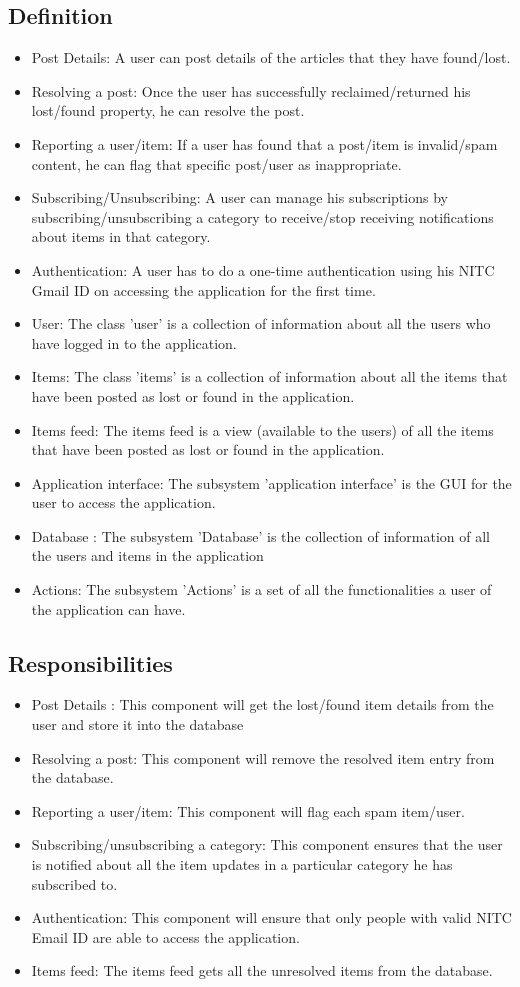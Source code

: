 \documentclass[a4paper,12pt]{article}
\begin{document}
\subsection{Definition}
\begin{itemize}
\item Post Details: A user can post details of the articles that they have found/lost. 
\item Resolving a post: Once the user has successfully reclaimed/returned his lost/found property, he can resolve the post. 
\item Reporting a user/item: If a user has found that a post/item is invalid/spam content, he can flag that specific post/user as inappropriate. 
\item Subscribing/Unsubscribing: A user can manage his subscriptions by subscribing/unsubscribing a category to receive/stop receiving notifications about items in that category.
\item Authentication: A user has to do a one-time authentication using his NITC Gmail ID on accessing the application for the first time. 
\item User: The class 'user' is a collection of information about all the users who have logged in to the application.
\item Items: The class 'items' is a collection of information about all the items that have been posted as lost or found in the application. 
\item Items feed: The items feed is a view (available to the users) of all the items that have been posted as lost or found in the application. 
\item Application interface: The subsystem 'application interface' is the GUI for the user to access the application.     
\item Database : The subsystem 'Database' is the collection of information of all the users and items in the application 
\item Actions: The subsystem 'Actions' is a set of all the functionalities a user of the application can have.
\end{itemize}
\subsection{Responsibilities}
\begin{itemize}
\item Post Details : This component will get the lost/found item details from the user and store it into the database 
\item Resolving a post: This component will remove the resolved item entry from the database. 
\item Reporting a user/item: This component will flag each spam item/user. 
\item Subscribing/unsubscribing a category: This component ensures that the user is notified about all the item updates in a particular category he has subscribed to. 
\item Authentication: This component will ensure that only people with valid NITC Email ID are able to access the application. 
\item Items feed: The items feed gets all the unresolved items from the database.
\end{itemize}
\end{document}
